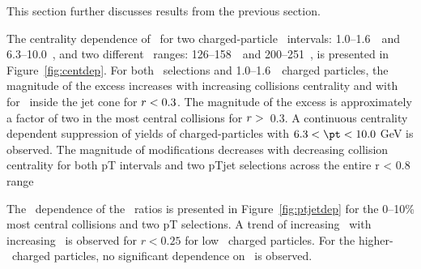 
This section further discusses results from the previous section.

The centrality dependence of \RDptr\ for two charged-particle \pt\ intervals: 1.0--1.6~\GeV\ and \mbox{6.3--10.0~\GeV}, and two different \ptjet\ ranges: 126--158~\GeV\ and 200--251~\GeV, is presented in Figure~\ref{fig:centdep}. 
For both \ptjet\ selections and  1.0--1.6~\GeV\ charged particles, the magnitude of the excess increases
with increasing collisions centrality and with \rvar\, for \rvar\ inside the jet cone for $\mbox{$r$} < 0.3$.  The magnitude of the excess is
approximately a factor of two in the most central collisions for $\mbox{$r$} >$~0.3.
A continuous centrality dependent suppression of  yields of charged-particles with $6.3 < \pt < 10.0$ GeV is observed.
The magnitude of modifications decreases with decreasing collision centrality for both pT intervals and two pTjet selections across the entire r < 0.8 range

The \ptjet\ dependence of the \RDptr\ ratios is presented in Figure~\ref{fig:ptjetdep} for the 0--10\% most central collisions and two pT selections.
  A trend of increasing \RDptr\ with increasing \ptjet\ is observed for $r < 0.25$ for low 
\pt\ charged particles. 
For the higher-\pt\ charged particles, no significant dependence on \ptjet\ is observed. 

